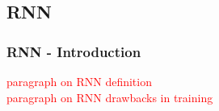 \documentclass[12pt]{report}
\begin{document}







\newpage
\subsection{RNN}

\subsubsection{RNN - Introduction}
\textcolor{red}{paragraph on RNN definition}\\

\textcolor{red}{paragraph on RNN drawbacks in training}\\


\end{document}

